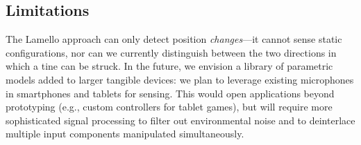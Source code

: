     \subsection{Limitations}

        The Lamello approach can only detect position \emph{changes}---it cannot sense static configurations, nor can we currently distinguish between the two directions in which a tine can be struck.  In the future, we envision a library of parametric models added to larger tangible devices: we plan to leverage existing microphones in smartphones and tablets for sensing. This would open applications beyond prototyping (e.g., custom controllers for tablet games), but will require more sophisticated signal processing to filter out environmental noise and to deinterlace multiple input components manipulated simultaneously.